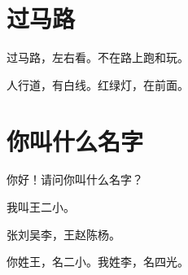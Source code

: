 \documentclass[12pt,UTF-8,openany]{ctexbook}
\begin{document}
\hanzibox{}\hanzibox{}\hanzibox{}\hanzibox{}\hspace{1em}




\chapter{过马路}

\begin{large}
    
    过马路，左右看。不在路上跑和玩。
    
    人行道，有白线。红绿灯，在前面。
    
\end{large}


\clearpage

\begin{center}
    
\end{center}


\hanzibox{}\hanzibox{}\hanzibox{}\hanzibox{}\hspace{1em}\hanzibox{}\hanzibox{}\hanzibox{}\hanzibox{}

\hanzibox{}\hanzibox{}\hanzibox{}\hanzibox{}\hspace{1em}\hanzibox{}\hanzibox{}\hanzibox{}\hanzibox{}

\hanzibox{}\hanzibox{}\hanzibox{}\hanzibox{}\hspace{1em}\hanzibox{}\hanzibox{}\hanzibox{}\hanzibox{}

\hanzibox{}\hanzibox{}\hanzibox{}\hanzibox{}\hspace{1em}\hanzibox{}\hanzibox{}\hanzibox{}\hanzibox{}






\chapter{你叫什么名字}

\begin{large}
    
    你好！请问你叫什么名字？
    
    我叫王二小。
    
    张刘吴李，王赵陈杨。
    
    你姓王，名二小。我姓李，名四光。
    
\end{large}
\end{document}
